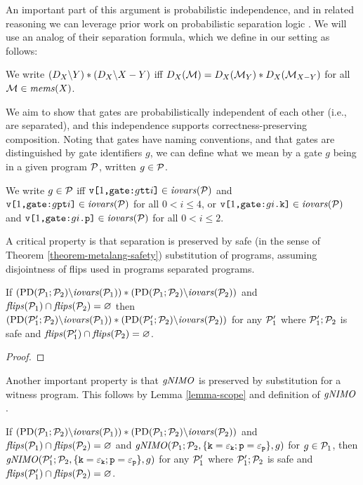 An important part of this argument is probabilistic independence,
and in related reasoning we can leverage prior work on probabilistic
separation logic \cite{barthe2019probabilistic}. We will use an
analog of their separation formula, which we define in our setting as follows:
\begin{definition}
  We write $(D_{X}\backslash Y) * (D_{X}\backslash X-Y)$ iff
  $D_{X}(\mathcal{M}) = D_{X}(\mathcal{M}_{Y}) * D_{X}(\mathcal{M}_{X-Y})$
  for all $\mathcal{M} \in \mathit{mems}(X)$.
\end{definition}

We aim to show that gates are probabilistically independent of
each other (i.e., are separated), and this independence supports
correctness-preserving composition. Noting that gates have
naming conventions, and that gates are distinguished by gate
identifiers $g$, we can define what we mean by a gate
$g$ being in a given program $\mathcal{P}$, written $g \in \mathcal{P}$. 
\begin{definition}
  We write $g \in \mathcal{P}$ iff $\texttt{v[}1\texttt{,}\texttt{gate:}g\texttt{tt}i\texttt{]} \in \mathit{iovars}(\mathcal{P})$
  and $\texttt{v[}1\texttt{,}\texttt{gate:}g\texttt{pt}i\texttt{]} \in \mathit{iovars}(\mathcal{P})$ for all $0 < i \le 4$,
  or  $\texttt{v[}1\texttt{,}\texttt{gate:}gi\texttt{.k}\texttt{]} \in \mathit{iovars}(\mathcal{P})$
  and $\texttt{v[}1\texttt{,}\texttt{gate:}gi\texttt{.p}\texttt{]} \in \mathit{iovars}(\mathcal{P})$ for all $0 < i \le 2$.
\end{definition}

A critical property is that separation is preserved by safe
(in the sense of Theorem \ref{theorem-metalang-safety}) substitution
of programs, assuming disjointness of flips used in programs separated
programs. 
\begin{lemma}
  \label{lemma-scope}
  If $(\mathrm{PD}(\mathcal{P}_1;\mathcal{P}_2)\backslash\mathit{iovars}(\mathcal{P}_1)) *
  (\mathrm{PD}(\mathcal{P}_1;\mathcal{P}_2)\backslash\mathit{iovars}(\mathcal{P}_2))$ and
  $\mathit{flips}(\mathcal{P}_1) \cap \mathit{flips}(\mathcal{P}_2) = \varnothing$ then
  $(\mathrm{PD}(\mathcal{P}_1';\mathcal{P}_2)\backslash\mathit{iovars}(\mathcal{P}_1)) *
  (\mathrm{PD}(\mathcal{P}_1';\mathcal{P}_2)\backslash\mathit{iovars}(\mathcal{P}_2))$ for any
  $\mathcal{P}_1'$ where $\mathcal{P}_1';\mathcal{P}_2$ is safe and $\mathit{flips}(\mathcal{P}_1')
  \cap \mathit{flips}(\mathcal{P}_2) = \varnothing$.
\end{lemma}
\begin{proof}
\end{proof}

Another important property is that $\mathit{gNIMO}$ is preserved by substitution
for a witness program. This follows by Lemma \ref{lemma-scope} and definition
of $\mathit{gNIMO}$. 
\begin{lemma}
  \label{lemma-gnimo}
  If $(\mathrm{PD}(\mathcal{P}_1;\mathcal{P}_2)\backslash\mathit{iovars}(\mathcal{P}_1)) * (\mathrm{PD}(\mathcal{P}_1;\mathcal{P}_2)\backslash\mathit{iovars}(\mathcal{P}_2))$
  and $\mathit{flips}(\mathcal{P}_1) \cap \mathit{flips}(\mathcal{P}_2) = \varnothing$ and
  $\mathit{gNIMO}(\mathcal{P}_1;\mathcal{P}_2,\{ \texttt{k} = \varepsilon_{\texttt{k}}; \texttt{p} = \varepsilon_{\texttt{p}}\}, g)$ for
  $g \in \mathcal{P}_1$,
  then $\mathit{gNIMO}(\mathcal{P}_1';\mathcal{P}_2,\{ \texttt{k} = \varepsilon_{\texttt{k}}; \texttt{p} = \varepsilon_{\texttt{p}}\}, g)$
  for any $\mathcal{P}_1'$ where $\mathcal{P}_1';\mathcal{P}_2$ is safe and
  $\mathit{flips}(\mathcal{P}_1') \cap \mathit{flips}(\mathcal{P}_2) = \varnothing$.
\end{lemma}

